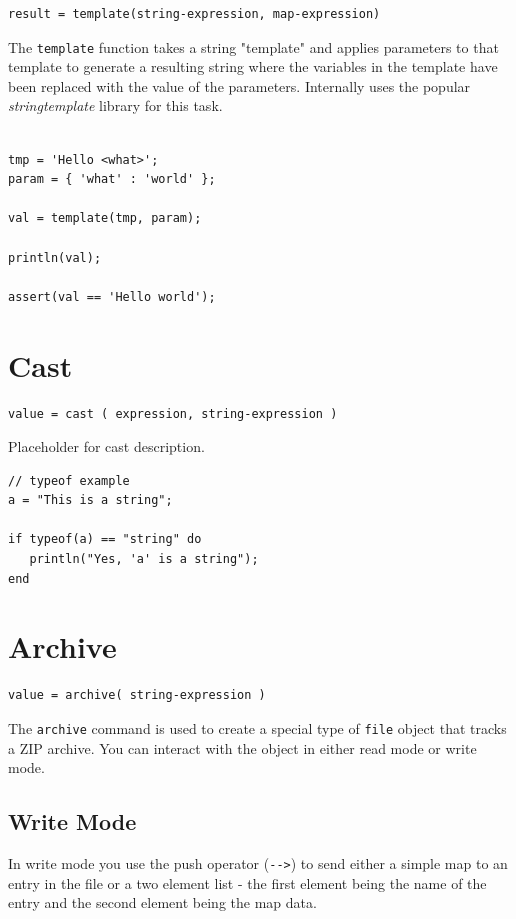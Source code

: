 \begin{verbatim}
result = template(string-expression, map-expression)
\end{verbatim}

The \verb+template+ function takes a string "template" and applies parameters to that template to generate a resulting string where the variables in the template have been replaced with the value of the parameters. Internally \Reflex uses the popular \emph{stringtemplate} library for this task.

\begin{lstlisting}[caption={Template example}]

tmp = 'Hello <what>';
param = { 'what' : 'world' };

val = template(tmp, param);

println(val);

assert(val == 'Hello world');

\end{lstlisting}

\section{Cast}

\begin{verbatim}
value = cast ( expression, string-expression )
\end{verbatim}

Placeholder for cast description.

\begin{lstlisting}[caption={Cast example}]
// typeof example
a = "This is a string";

if typeof(a) == "string" do
   println("Yes, 'a' is a string");
end

\end{lstlisting}

\section{Archive}
\begin{verbatim}
value = archive( string-expression )
\end{verbatim}
The \verb+archive+ command is used to create a special type of \verb+file+ object that tracks a ZIP archive. You can interact with the object in either read mode or write mode. 
\subsection{Write Mode}
In write mode you use the push operator (\verb+-->+) to send either a simple map to an entry in the file or a two element list - the first element being the name of the entry and the second element being the map data.

